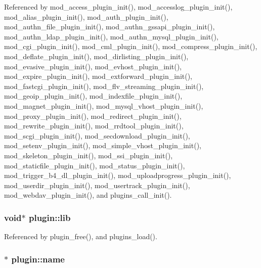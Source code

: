 Referenced by mod\-\_\-access\-\_\-plugin\-\_\-init(), mod\-\_\-accesslog\-\_\-plugin\-\_\-init(), mod\-\_\-alias\-\_\-plugin\-\_\-init(), mod\-\_\-auth\-\_\-plugin\-\_\-init(), mod\-\_\-authn\-\_\-file\-\_\-plugin\-\_\-init(), mod\-\_\-authn\-\_\-gssapi\-\_\-plugin\-\_\-init(), mod\-\_\-authn\-\_\-ldap\-\_\-plugin\-\_\-init(), mod\-\_\-authn\-\_\-mysql\-\_\-plugin\-\_\-init(), mod\-\_\-cgi\-\_\-plugin\-\_\-init(), mod\-\_\-cml\-\_\-plugin\-\_\-init(), mod\-\_\-compress\-\_\-plugin\-\_\-init(), mod\-\_\-deflate\-\_\-plugin\-\_\-init(), mod\-\_\-dirlisting\-\_\-plugin\-\_\-init(), mod\-\_\-evasive\-\_\-plugin\-\_\-init(), mod\-\_\-evhost\-\_\-plugin\-\_\-init(), mod\-\_\-expire\-\_\-plugin\-\_\-init(), mod\-\_\-extforward\-\_\-plugin\-\_\-init(), mod\-\_\-fastcgi\-\_\-plugin\-\_\-init(), mod\-\_\-flv\-\_\-streaming\-\_\-plugin\-\_\-init(), mod\-\_\-geoip\-\_\-plugin\-\_\-init(), mod\-\_\-indexfile\-\_\-plugin\-\_\-init(), mod\-\_\-magnet\-\_\-plugin\-\_\-init(), mod\-\_\-mysql\-\_\-vhost\-\_\-plugin\-\_\-init(), mod\-\_\-proxy\-\_\-plugin\-\_\-init(), mod\-\_\-redirect\-\_\-plugin\-\_\-init(), mod\-\_\-rewrite\-\_\-plugin\-\_\-init(), mod\-\_\-rrdtool\-\_\-plugin\-\_\-init(), mod\-\_\-scgi\-\_\-plugin\-\_\-init(), mod\-\_\-secdownload\-\_\-plugin\-\_\-init(), mod\-\_\-setenv\-\_\-plugin\-\_\-init(), mod\-\_\-simple\-\_\-vhost\-\_\-plugin\-\_\-init(), mod\-\_\-skeleton\-\_\-plugin\-\_\-init(), mod\-\_\-ssi\-\_\-plugin\-\_\-init(), mod\-\_\-staticfile\-\_\-plugin\-\_\-init(), mod\-\_\-status\-\_\-plugin\-\_\-init(), mod\-\_\-trigger\-\_\-b4\-\_\-dl\-\_\-plugin\-\_\-init(), mod\-\_\-uploadprogress\-\_\-plugin\-\_\-init(), mod\-\_\-userdir\-\_\-plugin\-\_\-init(), mod\-\_\-usertrack\-\_\-plugin\-\_\-init(), mod\-\_\-webdav\-\_\-plugin\-\_\-init(), and plugins\-\_\-call\-\_\-init().

\hypertarget{structplugin_ab8a4a02c20d1fa7be51580e5c7584998}{
\subsubsection[{lib}]{\setlength{\rightskip}{0pt plus 5cm}void$\ast$ plugin\-::lib}}\label{structplugin_ab8a4a02c20d1fa7be51580e5c7584998}


Referenced by plugin\-\_\-free(), and plugins\-\_\-load().

\hypertarget{structplugin_a235162d1645d005e4d8ea2cedc80a236}{
\subsubsection[{name}]{$\ast$ plugin\-::name}}\label{structplugin_a235162d1645d005e4d8ea2cedc80a236}


